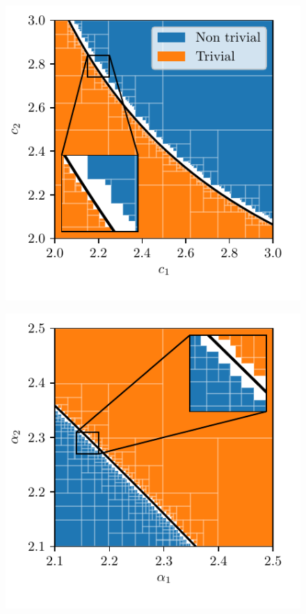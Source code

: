 \documentclass[
11pt, %
american, %
singlespacing, %
final, %
nolistspacing, %
liststotoc, %
headsepline, %
]{MastersDoctoralThesis} %
\begin{document}
\begin{figure}
	\ffigbox
	{
	\newcommand{\capcorrection}{\vspace{-10pt}}
	\begin{subfloatrow}
		{
			\capcorrection
			\includegraphics[scale=0.85]{critical_region_ErdosRenyiGraph_ErdosRenyiGraph.pdf}
		}{\caption{}}
		{
			\capcorrection
			\includegraphics[scale=0.85]{critical_region_ScaleFreeGraph_ScaleFreeGraph.pdf}
}
\end{subfloatrow}}
\end{figure}
\end{document}
